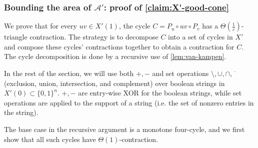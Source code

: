 \documentclass[10pt,a4paper]{article}
\newcommand{\prettyref}[1]{\cref{#1}}
\newtheorem{proposition}[theorem]{Proposition}
\theoremstyle{definition}
\theoremstyle{remark}
\renewcommand{\le}{\leqslant}
\numberwithin{equation}{section}
\let\pref=\prettyref
\begin{document}



\subsubsection[Cone area of X']{Bounding the area of $\mathcal{A}'$: proof of \pref{claim:X'-good-cone}} \label{sec:cone-area-X'}

We prove that for every $uv\in X'(1)$, the cycle $C = P_u\circ uv \circ P_v$ has a $\Theta(\frac{1}{\varepsilon})$-triangle contraction. 
The strategy is to decompose $C$ into a set of cycles in $X'$ and compose these cycles' contractions together to obtain a contraction for $C$. 
The cycle decomposition is done by a recursive use of \pref{lem:van-kampen}.

In the rest of the section, we will use both $+,-$ and set operations $\setminus, \cup, \cap, \overline{\phantom{v}}$ (exclusion, union, intersection, and complement) over boolean strings in $X'(0) \subset \{0,1\}^n$. $+,-$ are entry-wise XOR for the boolean strings, while set operations are applied to the support of a string (i.e. the set of nonzero entries in the string). 


The base case in the recursive argument is a monotone four-cycle, and we first show that all such cycles have $\Theta(1)$-contraction. 
\end{document}
